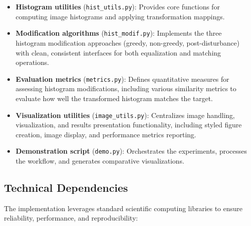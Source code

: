 \documentclass[12pt,a4paper]{article}
\begin{document}
\begin{itemize}
    \item \textbf{Histogram utilities} (\texttt{hist\_utils.py}): Provides core functions for computing image histograms and applying transformation mappings.
    
    \item \textbf{Modification algorithms} (\texttt{hist\_modif.py}): Implements the three histogram modification approaches (greedy, non-greedy, post-disturbance) with clean, consistent interfaces for both equalization and matching operations.
    
    \item \textbf{Evaluation metrics} (\texttt{metrics.py}): Defines quantitative measures for assessing histogram modifications, including various similarity metrics to evaluate how well the transformed histogram matches the target.

    \item \textbf{Visualization utilities} (\texttt{image\_utils.py}): Centralizes image handling, visualization, and results presentation functionality, including styled figure creation, image display, and performance metrics reporting.

    \item \textbf{Demonstration script} (\texttt{demo.py}): Orchestrates the experiments, processes the workflow, and generates comparative visualizations.
\end{itemize}


\subsection{Technical Dependencies}

The implementation leverages standard scientific computing libraries to ensure reliability, performance, and reproducibility:
\end{document}
